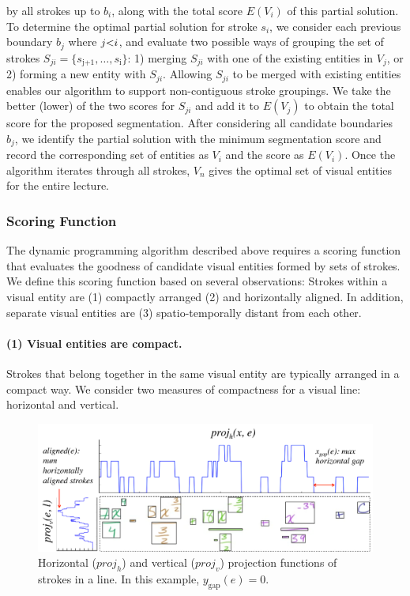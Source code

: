 by all strokes up to $b_i$, along with the total score $E(V_i)$ of
this partial solution.
%
To determine the optimal partial solution for stroke $s_i$, we
consider each previous boundary $b_j$ where
$\setlength{\thickmuskip}{0mu} j<i$, and evaluate two possible ways of
grouping the set of strokes $S_{ji} = \{s_\text{j+1},
\dots,s_\text{i}\}$: 1) merging $S_{ji}$ with one of the existing entities
in $V_j$, or 2) forming a new entity with $S_{ji}$. 
%
Allowing $S_{ji}$ to be merged with existing entities enables our
algorithm to support non-contiguous stroke groupings.
%
We take the better (lower) of the two scores for $S_{ji}$ and add it
to $E(V_j)$ to obtain the total score for the proposed
segmentation. After considering all candidate boundaries $b_j$, we
identify the partial solution with the minimum segmentation score and
record the corresponding set of entities as $V_i$ and the score as $E(V_i)$.
%
Once the algorithm iterates through all strokes, $V_n$ gives the
optimal set of visual entities for the entire lecture.
%
%
\subsubsection{Scoring Function}
The dynamic programming algorithm described above requires a scoring
function that evaluates the goodness of candidate visual entities
formed by sets of strokes. We define this scoring function based on
several observations: Strokes within a visual entity are (1) compactly arranged (2) and horizontally aligned. In addition, separate visual entities are (3) spatio-temporally distant from each other.
%
\paragraph{(1) Visual entities are compact.} Strokes that belong together
in the same visual entity are typically arranged in a compact way. We
consider two measures of compactness for a visual line:
horizontal and vertical.

\begin{figure}[h!]
	\centering
        \includegraphics[width=\textwidth]{figures/projection_function.pdf}
        	\captionsetup{font=footnotesize}
        \caption{Horizontal ($proj_h$) and vertical ($proj_v$) projection functions of strokes in a line. In this example, $y_\text{gap}(e)=0$.}
        \label{Fig:projection_function}
\end{figure}

